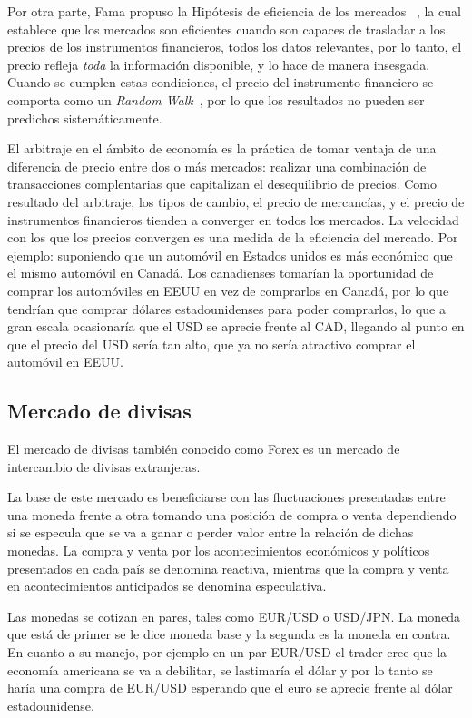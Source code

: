 Por otra parte, Fama propuso la Hipótesis de eficiencia de los mercados
~\cite{malkiel2012efficient}, la cual establece que los mercados son eficientes
cuando son capaces de trasladar a los precios de los instrumentos financieros,
todos los datos relevantes, por lo tanto, el precio refleja \emph{toda} la
información disponible, y lo hace de manera insesgada. Cuando se cumplen estas
condiciones, el precio del instrumento financiero se comporta como un
\emph{Random Walk}~\cite{fama1965random}, por lo que los resultados no pueden
ser predichos sistemáticamente.

El arbitraje en el ámbito de economía es la práctica de tomar ventaja de una
diferencia de precio entre dos o más mercados: realizar una combinación de
transacciones complentarias que capitalizan el desequilibrio de precios. Como
resultado del arbitraje, los tipos de cambio, el precio de mercancías, y el
precio de instrumentos financieros tienden a converger en todos los mercados.
La velocidad con los que los precios convergen es una medida de la eficiencia
del mercado. Por ejemplo: suponiendo que un automóvil en Estados unidos es más
económico que el mismo automóvil en Canadá. Los canadienses tomarían la
oportunidad de comprar los automóviles en EEUU en vez de comprarlos en Canadá,
por lo que tendrían que comprar dólares estadounidenses para poder comprarlos,
lo que a gran escala ocasionaría que el USD se aprecie frente al CAD, llegando
al punto en que el precio del USD sería tan alto, que ya no sería atractivo
comprar el automóvil en EEUU.

\subsection{Mercado de divisas}
El mercado de divisas también conocido como Forex es un mercado de intercambio
de divisas extranjeras.

La base de este mercado es beneficiarse con las fluctuaciones presentadas entre
una moneda frente a otra tomando una posición de compra o venta dependiendo si
se especula que se va a ganar o perder valor entre la relación de dichas
monedas. La compra y venta por los acontecimientos económicos y políticos
presentados en cada país se denomina reactiva, mientras que la compra y venta
en acontecimientos anticipados se denomina especulativa. 

Las monedas se cotizan en pares, tales como EUR/USD o USD/JPN. La moneda que
está de primer se le dice moneda base y la segunda es la moneda en contra. En
cuanto a su manejo, por ejemplo en un par EUR/USD el trader cree que la
economía americana se va a debilitar, se lastimaría el dólar y por lo tanto se
haría una compra de EUR/USD esperando que el euro se aprecie frente al dólar
estadounidense. 

